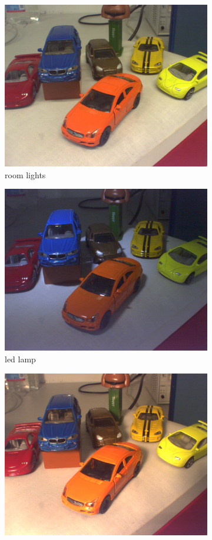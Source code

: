 \documentclass[
a4paper,     %
11pt         %
]{scrartcl}  %
\begin{document}
\begin{figure}[ht!]
\centering
\begin{subfigure}{.3\textwidth}
  \centering
  \includegraphics[width=.8\linewidth]{./Bildg_Messtechnik_Lab/ColorSpaces/pictures/bild_ohne.png}
  \caption{room lights}
\end{subfigure}
\begin{subfigure}{.3\textwidth}
  \centering
  \includegraphics[width=.8\linewidth]{./Bildg_Messtechnik_Lab/ColorSpaces/pictures/bild_led.png}
  \caption{led lamp}
\end{subfigure}
\begin{subfigure}{.3\textwidth}
  \centering
  \includegraphics[width=.8\linewidth]{./Bildg_Messtechnik_Lab/ColorSpaces/pictures/bild_strahler.png}

\end{subfigure}
\end{figure}
\end{document}
